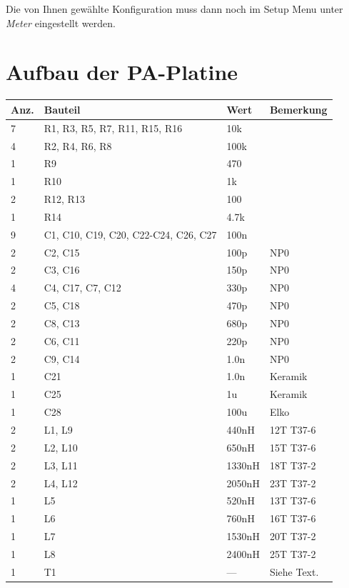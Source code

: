 \documentclass[10pt, a4paper]{paper}
\begin{document}
Die von Ihnen gewählte Konfiguration muss dann noch im Setup Menu unter \emph{Meter} eingestellt werden.


\clearpage
\section{Aufbau der PA-Platine} \label{sec:pa}
\begin{table}[!ht]
 \begin{tabular}{|p{1cm}|p{6cm}|p{2cm}|p{3cm}|} \hline 
 Anz. & Bauteil & Wert & Bemerkung \\ \hline
 7  & R1, R3, R5, R7, R11, R15, R16 & 10k & \\
 4  & R2, R4, R6, R8 & 100k & \\
 1  & R9 & 470 & \\
 1  & R10 & 1k & \\
 2  & R12, R13 & 100 & \\
 1  & R14 & 4.7k & \\
 
 9  & C1, C10, C19, C20, C22-C24, C26, C27 & 100n & \\
 2  & C2, C15 & 100p & NP0 \\
 2  & C3, C16 & 150p & NP0 \\
 4  & C4, C17, C7, C12 & 330p & NP0 \\
 2  & C5, C18 & 470p & NP0 \\
 2  & C8, C13 & 680p & NP0 \\
 2  & C6, C11 & 220p & NP0 \\
 2  & C9, C14 & 1.0n & NP0 \\
 1  & C21 & 1.0n & Keramik\\ 
 1  & C25 & 1u & Keramik \\
 1  & C28 & 100u & Elko \\
 
 2  & L1, L9 & 440nH & 12T T37-6\\
 2  & L2, L10 & 650nH & 15T T37-6\\
 2  & L3, L11 & 1330nH & 18T T37-2\\
 2  & L4, L12 & 2050nH & 23T T37-2\\
 1  & L5 & 520nH & 13T T37-6\\
 1  & L6 & 760nH & 16T T37-6\\
 1  & L7 & 1530nH & 20T T37-2\\
 1  & L8 & 2400nH & 25T T37-2\\

 1  & T1 & --- & Siehe Text.\\ 
 

\end{tabular}
\end{table}
\end{document}
